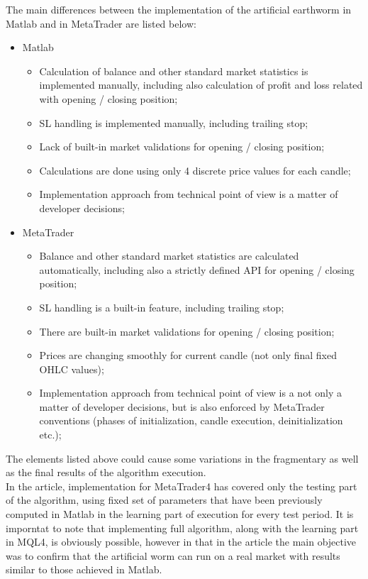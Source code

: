 \documentclass[runningheads,a4paper]{llncs}
\begin{document}
The main differences between the implementation of the artificial earthworm in Matlab and in MetaTrader are listed below:
\begin{itemize}
\item Matlab
\begin{itemize}
\item Calculation of balance and other standard market statistics is implemented manually, including also calculation of profit and loss related with opening / closing position;
\item SL handling is implemented manually, including trailing stop;
\item Lack of built-in market validations for opening / closing position;
\item Calculations are done using only 4 discrete price values for each candle;
\item Implementation approach from technical point of view is a matter of developer decisions;
\end{itemize}
\item MetaTrader
\begin{itemize}
\item Balance and other standard market statistics are calculated automatically, including also a strictly defined API for opening / closing position;
\item SL handling is a built-in feature, including trailing stop;
\item There are built-in market validations for opening / closing position;
\item Prices are changing smoothly for current candle (not only final fixed OHLC values);
\item Implementation approach from technical point of view is a not only a matter of developer decisions, but is also enforced by MetaTrader conventions (phases of initialization, candle execution, deinitialization etc.);
\end{itemize}
\end{itemize}

The elements listed above could cause some variations in the fragmentary as well as the final results of the algorithm execution.\\

In the article, implementation for MetaTrader4 has covered only the testing part of the algorithm, using fixed set of parameters that have been previously computed in Matlab in the learning part of execution for every test period. It is imporntat to note that implementing full algorithm, along with the learning part in MQL4, is obviously possible, however in that in the article the main objective was to confirm that the artificial worm can run on a real market with results similar to those achieved in Matlab.\\
\end{document}
